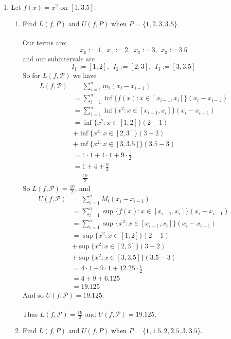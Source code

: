 \documentclass[12pt,letterpaper]{article}
\theoremstyle{case}
\theoremstyle{definition}
\begin{document}
\begin{enumerate}
\begin{enumerate}
		\end{enumerate}
		\item Let $f(x)=x^2$ on $[1,3.5]$.
		\begin{enumerate}
			\item Find $L(f,P)$ and $U(f,P)$ when $P=\{1,2,3,3.5\}$.
			\\\\Our terms are:
			\[x_0:=1,\ \ x_1:=2,\ \ x_2:=3,\ \ x_3:=3.5\]
			and our subintervals are
			\[I_1:=[1,2],\ \ I_2:=[2,3],\ \ I_3:=[3,3.5]\]
			So for $L(f,\mathcal{P})$ we have
			\begin{align*}
				L(f,\mathcal{P}) &= \sum_{i=1}^{n} m_i (x_i-x_{i-1}) \\
				&= \sum_{i=1}^{n} \inf \{f(x): x \in [x_{i-1},x_i]\}(x_i-x_{i-1}) \\
				&= \sum_{i=1}^{n} \inf \{x^2: x \in [x_{i-1},x_i]\}(x_i-x_{i-1}) \\
				&= \inf \{x^2: x \in [1,2]\}(2-1) \\
				&+ \inf \{x^2: x \in [2,3]\}(3-2) \\
				&+ \inf \{x^2: x \in [3,3.5]\}(3.5-3) \\
				&= 1 \cdot 1 + 4 \cdot 1 + 9 \cdot \frac{1}{2} \\
				&= 1 + 4 + \frac{9}{2} \\
				&= \frac{19}{2}
			\end{align*}
			So $L(f,\mathcal{P}) = \frac{19}{2}$, and
			\begin{align*}
				U(f,\mathcal{P}) &= \sum_{i=1}^{n} M_i (x_i-x_{i-1}) \\
				&= \sum_{i=1}^{n} \sup\{f(x): x \in [x_{i-1},x_i]\}(x_i-x_{i-1}) \\
				&= \sum_{i=1}^{n} \sup \{x^2: x \in [x_{i-1},x_i]\}(x_i-x_{i-1}) \\
				&= \sup \{x^2: x \in [1,2]\}(2-1) \\
				&+ \sup \{x^2: x \in [2,3]\}(3-2) \\
				&+ \sup \{x^2: x \in [3,3.5]\}(3.5-3) \\
				&= 4 \cdot 1 + 9 \cdot 1 + 12.25 \cdot \frac{1}{2} \\
				&= 4 +9 + 6.125 \\
				&= 19.125
			\end{align*}
			And so $U(f,\mathcal{P})=19.125$.\\\\
			Thus $L(f,\mathcal{P})= \frac{19}{2}$ and $U(f,\mathcal{P})=19.125$.\\ 
			\item Find $L(f,P)$ and $U(f,P)$ when $P=\{1,1.5,2,2.5,3,3.5\}$.

\end{enumerate}
\end{enumerate}
\end{document}
